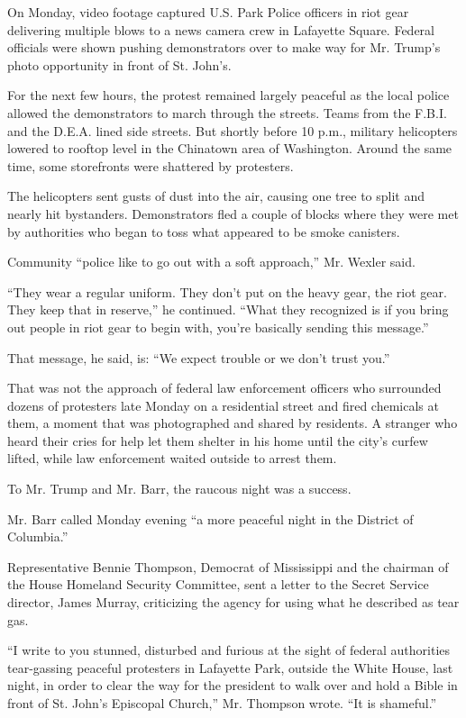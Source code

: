 On Monday, video footage captured U.S. Park Police officers in riot gear
delivering multiple blows to a news camera crew in Lafayette Square.
Federal officials were shown pushing demonstrators over to make way for
Mr. Trump's photo opportunity in front of St. John's.

For the next few hours, the protest remained largely peaceful as the
local police allowed the demonstrators to march through the streets.
Teams from the F.B.I. and the D.E.A. lined side streets. But shortly
before 10 p.m., military helicopters lowered to rooftop level in the
Chinatown area of Washington. Around the same time, some storefronts
were shattered by protesters.

The helicopters sent gusts of dust into the air, causing one tree to
split and nearly hit bystanders. Demonstrators fled a couple of blocks
where they were met by authorities who began to toss what appeared to be
smoke canisters.

Community ``police like to go out with a soft approach,'' Mr. Wexler
said.

``They wear a regular uniform. They don't put on the heavy gear, the
riot gear. They keep that in reserve,'' he continued. ``What they
recognized is if you bring out people in riot gear to begin with, you're
basically sending this message.''

That message, he said, is: ``We expect trouble or we don't trust you.''

That was not the approach of federal law enforcement officers who
surrounded dozens of protesters late Monday on a residential street and
fired chemicals at them, a moment that was photographed and shared by
residents. A stranger who heard their cries for help let them shelter in
his home until the city's curfew lifted, while law enforcement waited
outside to arrest them.

To Mr. Trump and Mr. Barr, the raucous night was a success.

Mr. Barr called Monday evening ``a more peaceful night in the District
of Columbia.''

Representative Bennie Thompson, Democrat of Mississippi and the chairman
of the House Homeland Security Committee, sent a letter to the Secret
Service director, James Murray, criticizing the agency for using what he
described as tear gas.

``I write to you stunned, disturbed and furious at the sight of federal
authorities tear-gassing peaceful protesters in Lafayette Park, outside
the White House, last night, in order to clear the way for the president
to walk over and hold a Bible in front of St. John's Episcopal Church,''
Mr. Thompson wrote. ``It is shameful.''

